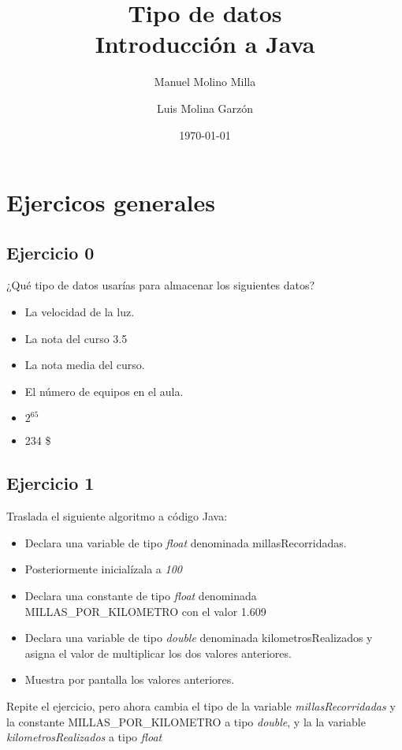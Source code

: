 \documentclass[4paper]{article}
\author{Manuel Molino Milla \and Luis Molina Garzón}
\title{\textbf{Tipo de datos}
\\Introducción a Java}
\date{\today}
\begin{document}
\maketitle
\tableofcontents
\newpage
\section{Ejercicos generales}
\subsection{Ejercicio 0}
¿Qué tipo de datos usarías para almacenar los siguientes datos?
\begin{itemize}
\item La velocidad de la luz.
\item La nota del curso 3.5
\item La nota media del curso.
\item El número de equipos  en el aula.
\item $2^{65}$
\item 234 \$

\end{itemize}
\subsection{Ejercicio 1}
Traslada el siguiente algoritmo a código Java:
\begin{itemize}
\item Declara una variable de tipo \emph{float} denominada millasRecorridadas.
\item Posteriormente inicialízala a \emph{100}
\item Declara una constante de tipo \emph{float} denominada MILLAS\_POR\_KILOMETRO con el valor 1.609
\item Declara una variable de tipo \emph{double} denominada kilometrosRealizados y asigna el valor de multiplicar los dos valores anteriores.
\item Muestra por pantalla los valores anteriores.
\end{itemize}
Repite el ejercicio, pero ahora cambia el tipo de la variable \emph{millasRecorridadas} y la constante MILLAS\_POR\_KILOMETRO a tipo \emph{double}, y la la variable \emph{kilometrosRealizados} a tipo \emph{float}
\end{document}
